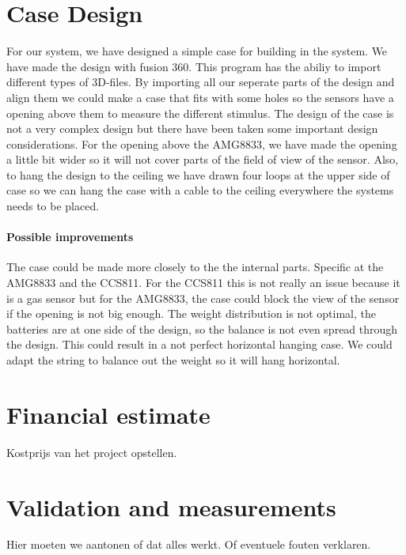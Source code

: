\documentclass[11pt,a4paper]{article}
\begin{document}
\section{Case Design}
For our system, we have designed a simple case for building in the system. We have made the design with fusion 360. This program has the abiliy to import different types of 3D-files. By importing all our seperate parts of the design and align them we could make a case that fits with some holes so the sensors have a opening above them to measure the different stimulus. The design of the case is not a very complex design but there have been taken some important design considerations. For the opening above the AMG8833, we have made the opening a little bit wider so it will not cover parts of the field of view of the sensor. Also, to hang the design to the ceiling we have drawn four loops at the upper side of case so we can hang the case with a cable to the ceiling everywhere the systems needs to be placed.


\paragraph{Possible improvements}
The case could be made more closely to the the internal parts. Specific at the AMG8833 and the CCS811. For the CCS811 this is not  really an issue because it is a gas sensor but for the AMG8833, the case could block the view of the sensor if the opening is not big enough. The weight distribution is not optimal, the batteries are at one side of the design, so the balance is not even spread through the design. This could result in a not perfect horizontal hanging case. We could adapt the string to balance out the weight so it will hang horizontal.


\section{Financial estimate}
Kostprijs van het project opstellen.

\section{Validation and measurements}
Hier moeten we aantonen of dat alles werkt. Of eventuele fouten verklaren.

\newpage
	

\newpage
\appendix
\end{document}
